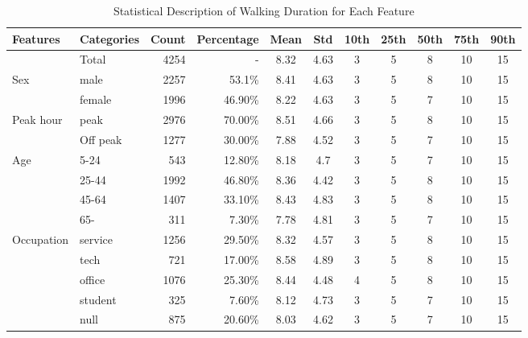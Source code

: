 \begin{sidewaystable}[htbp]
	\caption{Statistical Description of Walking Duration for Each Feature}
	\label{tab:chp4:StatisticalDescription}
	\centering
	\small
	\renewcommand{\arraystretch}{1.25}
	\begin{tabular}{llrrccccccc}
		\Xhline{1.5pt}
		Features & Categories & Count & Percentage & Mean & Std & 10th & 25th & 50th & 75th & 90th\\
		
		\midrule
		& Total    & 4254  & -         & 8.32  & 4.63  & 3     & 5     & 8     & 10    & 15 \\
		
		\midrule
		\multicolumn{1}{l}{Sex}
		& male     & 2257  & 53.1\%    & 8.41  & 4.63  & 3     & 5     & 8     & 10    & 15 \\
		& female   & 1996  & 46.90\%   & 8.22  & 4.63  & 3     & 5     & 7     & 10    & 15 \\
		
		\midrule
		\multicolumn{1}{l}{Peak hour}
		& peak     & 2976  & 70.00\%   & 8.51  & 4.66  & 3     & 5     & 8     & 10    & 15 \\
		& Off peak & 1277  & 30.00\%   & 7.88  & 4.52  & 3     & 5     & 7     & 10    & 15 \\
		
		\midrule
		\multicolumn{1}{l}{Age}
		& 5-24     & 543   & 12.80\%   & 8.18  & 4.7   & 3     & 5     & 7     & 10    & 15 \\
		& 25-44    & 1992  & 46.80\%   & 8.36  & 4.42  & 3     & 5     & 8     & 10    & 15 \\
		& 45-64    & 1407  & 33.10\%   & 8.43  & 4.83  & 3     & 5     & 8     & 10    & 15 \\
		& 65-      & 311   &  7.30\%   & 7.78  & 4.81  & 3     & 5     & 7     & 10    & 15 \\
		
		\midrule
		\multicolumn{1}{l}{Occupation}
		& service  & 1256  & 29.50\%   & 8.32  & 4.57  & 3     & 5     & 8     & 10    & 15 \\
		& tech     & 721   & 17.00\%   & 8.58  & 4.89  & 3     & 5     & 8     & 10    & 15 \\
		& office   & 1076  & 25.30\%   & 8.44  & 4.48  & 4     & 5     & 8     & 10    & 15 \\
		& student  & 325   &  7.60\%   & 8.12  & 4.73  & 3     & 5     & 7     & 10    & 15 \\
		& null     & 875   & 20.60\%   & 8.03  & 4.62  & 3     & 5     & 7     & 10    & 15 \\
		

\end{tabular}
\end{sidewaystable}
